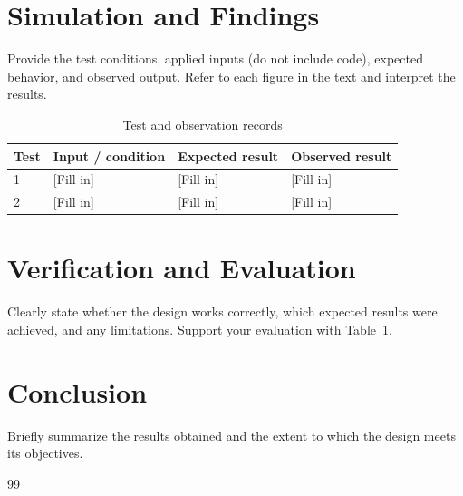 \documentclass[12pt,a4paper]{article}
\begin{document}
\section{Simulation and Findings}
Provide the test conditions, applied inputs (do not include code), expected behavior, and observed output. Refer to each figure in the text and interpret the results.

\begin{table}[htbp]\centering
\caption{Test and observation records}
\label{tab:test}
\begin{tabularx}{\linewidth}{@{}lXXX@{}}
\toprule
Test & Input / condition & Expected result & Observed result \\
\midrule
1 & [Fill in] & [Fill in] & [Fill in] \\
2 & [Fill in] & [Fill in] & [Fill in] \\
\bottomrule
\end{tabularx}
\end{table}


\section{Verification and Evaluation}
Clearly state whether the design works correctly, which expected results were achieved, and any limitations. Support your evaluation with Table~\ref{tab:test}.

\section{Conclusion}
Briefly summarize the results obtained and the extent to which the design meets its objectives.

\begin{thebibliography}{99}
\end{thebibliography}
\end{document}

